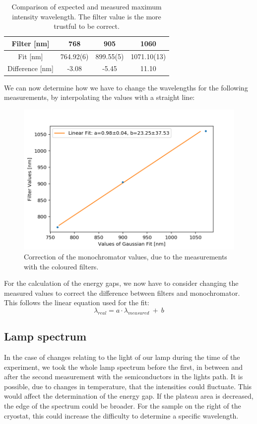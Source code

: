 \documentclass[]{article}
\begin{document}
\begin{table}[H]
	\centering
	\begin{tabular}{c|c|c|c}
	Filter [nm] & 768 & 905 & 1060 \\ \hline
	Fit [nm] & 764.92(6) & 899.55(5) & 1071.10(13) \\ \hline
	Difference [nm] & -3.08 & -5.45 & 11.10
	\end{tabular}
	\caption{Comparison of expected and measured maximum intensity wavelength. The filter value is the more trustful to be correct.}
\end{table}

We can now determine how we have to change the wavelengths for the following measurements, by interpolating the values with a straight line:

\begin{figure}[H]
\centering
\includegraphics[width=.9\textwidth]{Plots/LambdaCorrection.png}
\caption{Correction of the monochromator values, due to the measurements with the coloured filters.}
\label{fig:LambdaCorrection}
\end{figure}

For the calculation of the energy gaps, we now have to consider changing the measured values to correct the difference between filters and monochromator. This follows the linear equation used for the fit: 
\begin{equation}
\lambda_{real} = a\cdot \lambda_{measured} \ + \ b
\end{equation}

\subsection{Lamp spectrum} \label{lamp spectrum}
In the case of changes relating to the light of our lamp during the time of the experiment, we took the whole lamp spectrum before the first, in between and after the second measurement with the semiconductors in the lights path. It is possible, due to changes in temperature, that the intensities could fluctuate. This would affect the determination of the energy gap. If the plateau area is decreased, the edge of the spectrum could be broader. For the sample on the right of the cryostat, this could increase the difficulty to determine a specific wavelength.
\end{document}
